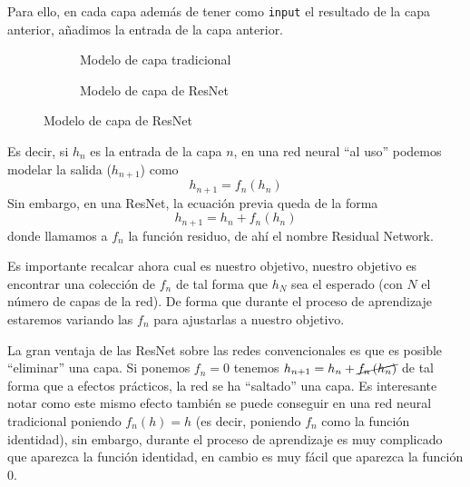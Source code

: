\documentclass[12pt]{report}
\begin{document}
Para ello, en cada capa además de tener como \texttt{input} el resultado de la
capa anterior, añadimos la entrada de la capa anterior.

\begin{figure}[H]
    \centering
    \begin{subfigure}{0.48\textwidth}
        \caption{Modelo de capa tradicional}
    \end{subfigure}
    \begin{subfigure}{0.48\textwidth}
        \caption{Modelo de capa de ResNet}
    \end{subfigure}
\end{figure}

Es decir, si $h_n$ es la entrada de la capa $n$, en una red neural ``al uso''
podemos modelar la salida ($h_{n+1}$) como
\[
    h_{n+1} = f_n\left( h_n \right)
\]
Sin embargo, en una ResNet, la ecuación previa queda de la forma
\[
    h_{n+1} = h_{n} + f_n\left( h_n \right)
\]
donde llamamos a $f_n$ la función residuo, de ahí el nombre Residual Network.

Es importante recalcar ahora cual es nuestro objetivo, nuestro objetivo es
encontrar una colección de $f_n$ de tal forma que $h_N$ sea el esperado (con $N$
el número de capas de la red). De forma que durante el proceso de aprendizaje
estaremos variando las $f_n$ para ajustarlas a nuestro objetivo.

La gran ventaja de las ResNet sobre las redes convencionales es que es posible
``eliminar'' una capa. Si ponemos $f_n = 0$ tenemos $h_{n+1} = h_{n} +
\cancel{f_n\left( h_n \right)}$ de tal forma que a efectos prácticos, la red se
ha ``saltado'' una capa. Es interesante notar como este mismo efecto también se
puede conseguir en una red neural tradicional poniendo $f_n(h) = h$ (es decir,
poniendo $f_n$ como la función identidad), sin embargo, durante el proceso de
aprendizaje es muy complicado que aparezca la función identidad, en cambio es
muy fácil que aparezca la función 0.
\end{document}
